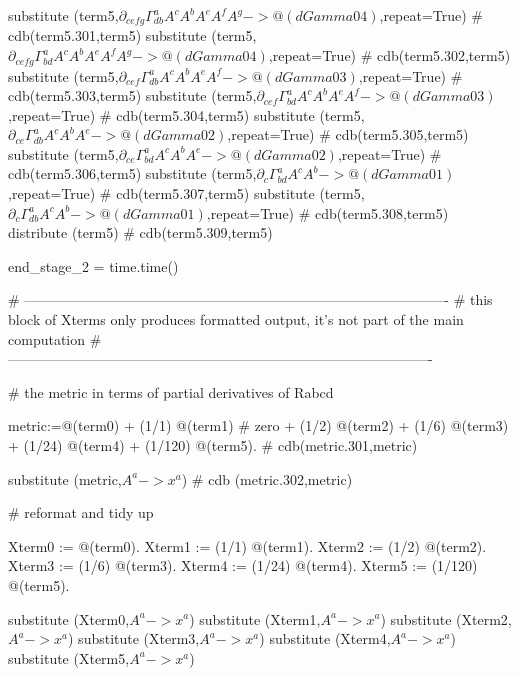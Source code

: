 \documentclass[12pt]{cdblatex}
\begin{document}
\begin{cadabra}
   substitute (term5,$\partial_{c e f g}{\Gamma^{a}_{d b}}A^{c}A^{b}A^{e}A^{f}A^{g} -> @(dGamma04)$,repeat=True)  # cdb(term5.301,term5)
   substitute (term5,$\partial_{c e f g}{\Gamma^{a}_{b d}}A^{c}A^{b}A^{e}A^{f}A^{g} -> @(dGamma04)$,repeat=True)  # cdb(term5.302,term5)
   substitute (term5,$\partial_{c e f}{\Gamma^{a}_{d b}}A^{c}A^{b}A^{e}A^{f} -> @(dGamma03)$,repeat=True)         # cdb(term5.303,term5)
   substitute (term5,$\partial_{c e f}{\Gamma^{a}_{b d}}A^{c}A^{b}A^{e}A^{f} -> @(dGamma03)$,repeat=True)         # cdb(term5.304,term5)
   substitute (term5,$\partial_{c e}{\Gamma^{a}_{d b}}A^{c}A^{b}A^{e} -> @(dGamma02)$,repeat=True)                # cdb(term5.305,term5)
   substitute (term5,$\partial_{c e}{\Gamma^{a}_{b d}}A^{c}A^{b}A^{e} -> @(dGamma02)$,repeat=True)                # cdb(term5.306,term5)
   substitute (term5,$\partial_{c}{\Gamma^{a}_{b d}}A^{c}A^{b} -> @(dGamma01)$,repeat=True)                       # cdb(term5.307,term5)
   substitute (term5,$\partial_{c}{\Gamma^{a}_{d b}}A^{c}A^{b} -> @(dGamma01)$,repeat=True)                       # cdb(term5.308,term5)
   distribute (term5)                                                                                             # cdb(term5.309,term5)

   end_stage_2 = time.time()

   # -------------------------------------------------------------------------------------------
   # this block of Xterms only produces formatted output, it's not part of the main computation
   # -------------------------------------------------------------------------------------------

   # the metric in terms of partial derivatives of Rabcd

   metric:=@(term0)
         + (1/1) @(term1)  # zero
         + (1/2) @(term2)
         + (1/6) @(term3)
         + (1/24) @(term4)
         + (1/120) @(term5).  # cdb(metric.301,metric)

   substitute (metric,$A^{a} -> x^{a}$)  # cdb (metric.302,metric)

   # reformat and tidy up

   Xterm0 := @(term0).
   Xterm1 := (1/1) @(term1).
   Xterm2 := (1/2) @(term2).
   Xterm3 := (1/6) @(term3).
   Xterm4 := (1/24) @(term4).
   Xterm5 := (1/120) @(term5).

   substitute (Xterm0,$A^{a} -> x^{a}$)
   substitute (Xterm1,$A^{a} -> x^{a}$)
   substitute (Xterm2,$A^{a} -> x^{a}$)
   substitute (Xterm3,$A^{a} -> x^{a}$)
   substitute (Xterm4,$A^{a} -> x^{a}$)
   substitute (Xterm5,$A^{a} -> x^{a}$)


\end{cadabra}
\end{document}

